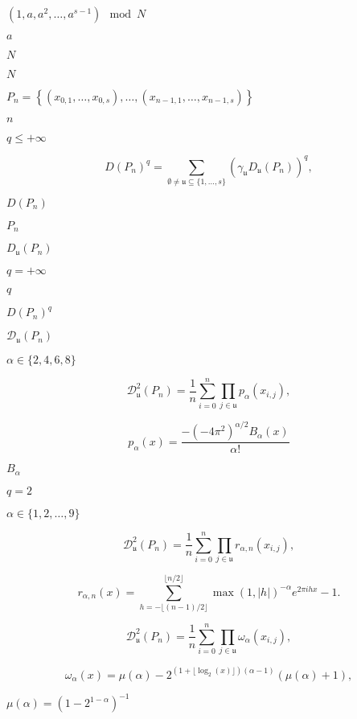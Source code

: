 \documentclass{article}
\begin{document}
$ (1, a, a^2, \dots, a^{s-1}) \mod N $
\pagebreak

$a$
\pagebreak

$N$
\pagebreak

$ N $
\pagebreak

$P_n = \left\{(x_{0,1}, \dots, x_{0, s}), \dots, (x_{n-1,1}, \dots, x_{n-1, s}) \right\}$
\pagebreak

$n$
\pagebreak

$ q \leq +\infty $
\pagebreak

\[    D(P_n)^q = \sum_{\emptyset \neq \mathfrak u \subseteq \{1, \dots, s\}}\left(\gamma_{\mathfrak u} D_{\mathfrak u}(P_n)\right)^q,
\]
\pagebreak

$D(P_n)$
\pagebreak

$P_n$
\pagebreak

$ D_{\mathfrak u}(P_n) $
\pagebreak

$q = +\infty$
\pagebreak

$q$
\pagebreak

$D(P_n)^q$
\pagebreak

$\mathcal D_{\mathfrak u}(P_n)$
\pagebreak

$\alpha \in \{2, 4, 6, 8\}$
\pagebreak

\[        \mathcal{D}^2_{\mathfrak u}(P_n) = \frac{1}{n} \sum_{i = 0}^n 
        \prod_{j \in \mathfrak u} p_{\alpha}(x_{i,j}),
\]
\pagebreak

\[        p_{\alpha}(x) = \frac{- (-4 \pi^2)^{\alpha/2} B_{\alpha}(x)}{\alpha!}
\]
\pagebreak

$B_{\alpha}$
\pagebreak

$ q = 2$
\pagebreak

$\alpha \in \{1, 2, \dots, 9\}$
\pagebreak

\[        \mathcal{D}^2_{\mathfrak u}(P_n) = \frac{1}{n} \sum_{i = 0}^n 
        \prod_{j \in \mathfrak u} r_{\alpha, n}(x_{i,j}),
\]
\pagebreak

\[        r_{\alpha, n}(x) = \sum_{h = - \lfloor (n-1)/2 \rfloor }^{\lfloor n/2 \rfloor} \max(1,|h|)^{-\alpha} e^{2 \pi i h x} - 1.
\]
\pagebreak

\[        \mathcal{D}^2_{\mathfrak u}(P_n) = \frac{1}{n} \sum_{i = 0}^n 
        \prod_{j \in \mathfrak u} \omega_{\alpha}(x_{i,j}),
\]
\pagebreak

\[        \omega_{\alpha}(x) = \mu(\alpha) - 2^{(1+\lfloor \log_2(x) \rfloor) (\alpha - 1)}(\mu(\alpha) + 1),
\]
\pagebreak

$ \mu(\alpha) = (1 - 2^{1- \alpha})^{-1} $
\pagebreak
\end{document}
